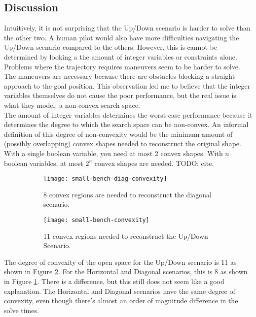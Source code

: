 \subsection{Discussion}
\label{subsec:naive-discussion}
Intuitively, it is not surprising that the Up/Down scenario is harder to solve than the other two. A human pilot would also have more difficulties navigating the Up/Down scenario compared to the others. However, this is cannot be determined by looking a the amount of integer variables or constraints alone.\\
Problems where the trajectory requires maneuvers seem to be harder to solve. The maneuvers are necessary because there are obstacles blocking a straight approach to the goal position. This observation led me to believe that the integer variables themselves do not cause the poor performance, but the real issue is what they model: a non-convex search space.\\
The amount of integer variables determines the worst-case performance because it determines the degree to which the search space can be non-convex. An informal definition of this degree of non-convexity would be the minimum amount of (possibly overlapping) convex shapes needed to reconstruct the original shape. With a single boolean variable, you need at most 2 convex shapes. With $n$ boolean variables, at most $2^n$ convex shapes are needed. TODO: cite.\\
\begin{figure}
	\centering
	\begin{subfigure}[t]{0.47\columnwidth}
        		\texttt{[image: small-bench-diag-convexity]}
        		\caption{8 convex regions are needed to reconstruct the diagonal scenario.}
        		 \label{fig:convex-diag-convexity}
	\end{subfigure}	
	\hfill
	\begin{subfigure}[t]{0.47\columnwidth}
        		\texttt{[image: small-bench-convexity]}
        		\caption{11 convex regions needed to reconstruct the Up/Down Scenario.}
        		 \label{fig:convex-full-convexity}
	\end{subfigure}	
    \caption{}
    \label{fig:benchmarks-convex}     
\end{figure}
The degree of convexity of the open space for the Up/Down scenario is 11 as shown in Figure \ref{fig:convex-full-convexity}. For the Horizontal and Diagonal scenarios, this is 8 as shown in Figure \ref{fig:convex-diag-convexity}. There is a difference, but this still does not seem like a good explanation. The Horizontal and Diagonal scenarios have the same degree of convexity, even though there's almost an order of magnitude difference in the solve times. \\
